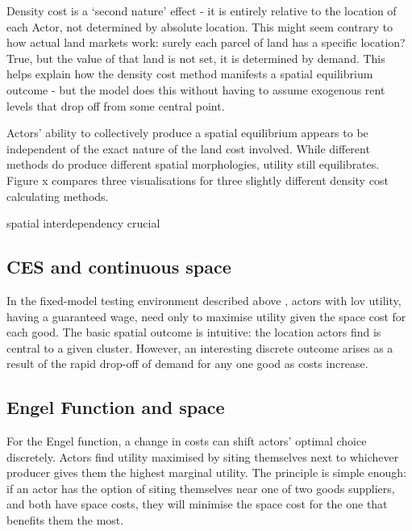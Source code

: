Density cost is a `second nature' effect - it is entirely relative to the location of each Actor, not determined by absolute location. This might seem contrary to how actual land markets work: surely each parcel of land has a specific location? True, but the value of that land is not set, it is determined by demand. This helps explain how the density cost method manifests a spatial equilibrium outcome - but the model does this without having to assume exogenous rent levels that drop off from some central point.

Actors' ability to collectively produce a spatial equilibrium appears to be independent of the exact nature of the land cost involved. While different methods do produce different spatial morphologies, utility still equilibrates. Figure x compares three visualisations for three slightly different density cost calculating methods.

spatial interdependency crucial 





\subsection{CES and continuous space}

In the fixed-model testing environment described above , actors with \gls{lov} utility, having a guaranteed wage, need only to maximise utility given the space cost for each good. The basic spatial outcome is intuitive: the location actors find is central to a given cluster. However, an interesting discrete outcome arises as a result of the rapid drop-off of demand for any one good as costs increase.



\subsection{Engel Function and space}

For the Engel function, a change in costs can shift actors' optimal choice discretely. Actors find utility maximised by siting themselves next to whichever producer gives them the highest marginal utility. The principle is simple enough: if an actor has the option of siting themselves near one of two goods suppliers, and both have space costs, they will minimise the space cost for the one that benefits them the most. 

